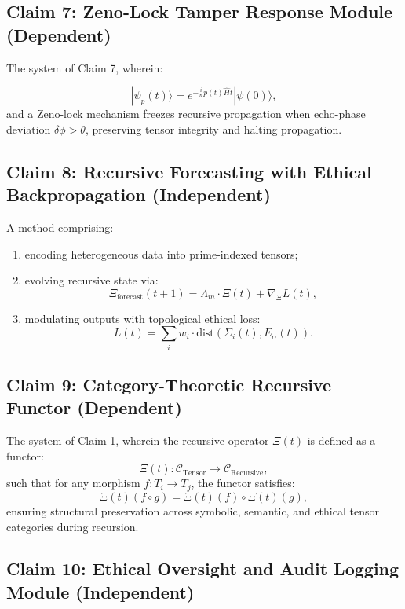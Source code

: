 \documentclass[12pt]{article}
\begin{document}
\subsection*{Claim 7: Zeno-Lock Tamper Response Module (Dependent)}

The system of Claim 7, wherein:

\[
|\psi_p(t)\rangle = e^{-\frac{i}{\hbar} p(t) \hat{H} t} |\psi(0)\rangle,
\]
and a Zeno-lock mechanism freezes recursive propagation when echo-phase deviation \( \delta\phi > \theta \), preserving tensor integrity and halting propagation.

\subsection*{Claim 8: Recursive Forecasting with Ethical Backpropagation (Independent)}

A method comprising:

\begin{enumerate}
    \item encoding heterogeneous data into prime-indexed tensors;
    \item evolving recursive state via:
    \[
    \Xi_{\text{forecast}}(t+1) = \Lambda_m \cdot \Xi(t) + \nabla_{\Xi} L(t),
    \]
    \item modulating outputs with topological ethical loss:
    \[
    L(t) = \sum_i w_i \cdot \text{dist}(\Sigma_i(t), E_\alpha(t)).
    \]
\end{enumerate}


\subsection*{Claim 9: Category-Theoretic Recursive Functor (Dependent)}

The system of Claim 1, wherein the recursive operator \( \Xi(t) \) is defined as a functor:
\[
\Xi(t): \mathcal{C}_{\text{Tensor}} \rightarrow \mathcal{C}_{\text{Recursive}},
\]
such that for any morphism \( f: T_i \rightarrow T_j \), the functor satisfies:
\[
\Xi(t)(f \circ g) = \Xi(t)(f) \circ \Xi(t)(g),
\]
ensuring structural preservation across symbolic, semantic, and ethical tensor categories during recursion.

\subsection*{Claim 10: Ethical Oversight and Audit Logging Module (Independent)}
\end{document}

